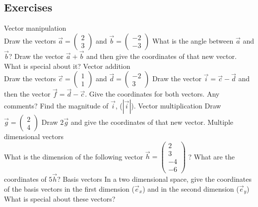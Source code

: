 \documentclass[a4paper]{report}
\begin{document}
\subsection{Exercises}
\begin{Exercise}[title= Answer the following questions,label=exVEC,difficulty=1]
\Question Vector manipulation\\ 
\subQuestion Draw the vectors $\vec{a} = \begin{pmatrix}
2 \\
3 
\end{pmatrix}$ and $\vec{b} = \begin{pmatrix}
-2 \\
-3 
\end{pmatrix}$
\subQuestion What is the angle between $\vec{a}$ and $\vec{b}$?
\subQuestion Draw the vector $\vec{a}+\vec{b}$ and then give the coordinates of that new vector. What is special about it?
\Question Vector addition\\
\subQuestion Draw the vectors $\vec{c} = \begin{pmatrix}
1 \\
1 
\end{pmatrix}$ and $\vec{d} = \begin{pmatrix}
-2 \\
3 
\end{pmatrix}$
\subQuestion Draw the vector $\vec{i}=\vec{c}-\vec{d}$ and then the vector $\vec{f}=\vec{d}-\vec{c}$. Give the coordinates for both vectors. Any comments?
\subQuestion Find the magnitude of $\vec{i}$, ($|\vec{i}|$).
\Question Vector multiplication
\subQuestion Draw $\vec{g} = \begin{pmatrix}
2 \\
4 
\end{pmatrix}$ 
\subQuestion Draw $2\vec{g}$ and give the coordinates of that new vector.
\Question Multiple dimensional vectors\\
\subQuestion What is the dimension of the following vector $\vec{h} = \begin{pmatrix}
2 \\
3 \\
-4\\
-6
\end{pmatrix}$ ?
\subQuestion What are the coordinates of $5\vec{h}$?
\Question Basis vectors
\subQuestion In a two dimensional space, give the coordinates of the basis vectors in the first dimension ($\vec{e}_x$) and in the second dimension ($\vec{e}_y$)
\subQuestion What is special about these vectors?
\end{Exercise}
\end{document}
